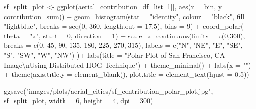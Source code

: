 \documentclass[
  letterpaper,
  DIV=11,
  numbers=noendperiod]{scrreprt}
\newenvironment{Shaded}{\begin{snugshade}}{\end{snugshade}}
\newcommand{\AttributeTok}[1]{\textcolor[rgb]{0.40,0.45,0.13}{#1}}
\newcommand{\DecValTok}[1]{\textcolor[rgb]{0.68,0.00,0.00}{#1}}
\newcommand{\FloatTok}[1]{\textcolor[rgb]{0.68,0.00,0.00}{#1}}
\newcommand{\FunctionTok}[1]{\textcolor[rgb]{0.28,0.35,0.67}{#1}}
\newcommand{\NormalTok}[1]{\textcolor[rgb]{0.00,0.23,0.31}{#1}}
\newcommand{\OtherTok}[1]{\textcolor[rgb]{0.00,0.23,0.31}{#1}}
\newcommand{\SpecialCharTok}[1]{\textcolor[rgb]{0.37,0.37,0.37}{#1}}
\newcommand{\StringTok}[1]{\textcolor[rgb]{0.13,0.47,0.30}{#1}}
\begin{document}
\begin{Shaded}
\begin{Highlighting}[]
\NormalTok{sf\_split\_plot }\OtherTok{\textless{}{-}}
  \FunctionTok{ggplot}\NormalTok{(aerial\_contribution\_df\_list[[}\DecValTok{1}\NormalTok{]], }
         \FunctionTok{aes}\NormalTok{(}\AttributeTok{x =}\NormalTok{ bin, }\AttributeTok{y =}\NormalTok{ contribution\_sum)) }\SpecialCharTok{+}
  \FunctionTok{geom\_histogram}\NormalTok{(}\AttributeTok{stat =} \StringTok{"identity"}\NormalTok{,}
                 \AttributeTok{colour =} \StringTok{"black"}\NormalTok{, }
                 \AttributeTok{fill =} \StringTok{"lightblue"}\NormalTok{, }
                 \AttributeTok{breaks =} \FunctionTok{seq}\NormalTok{(}\DecValTok{0}\NormalTok{, }\DecValTok{360}\NormalTok{, }\AttributeTok{length.out =} \FloatTok{17.5}\NormalTok{),}
                 \AttributeTok{bins =} \DecValTok{9}\NormalTok{) }\SpecialCharTok{+}
  \FunctionTok{coord\_polar}\NormalTok{(}
    \AttributeTok{theta =} \StringTok{"x"}\NormalTok{, }
    \AttributeTok{start =} \DecValTok{0}\NormalTok{, }
    \AttributeTok{direction =} \DecValTok{1}\NormalTok{) }\SpecialCharTok{+}
  \FunctionTok{scale\_x\_continuous}\NormalTok{(}\AttributeTok{limits =} \FunctionTok{c}\NormalTok{(}\DecValTok{0}\NormalTok{,}\DecValTok{360}\NormalTok{),}
    \AttributeTok{breaks =} \FunctionTok{c}\NormalTok{(}\DecValTok{0}\NormalTok{, }\DecValTok{45}\NormalTok{, }\DecValTok{90}\NormalTok{, }\DecValTok{135}\NormalTok{, }\DecValTok{180}\NormalTok{, }\DecValTok{225}\NormalTok{, }\DecValTok{270}\NormalTok{, }\DecValTok{315}\NormalTok{), }
    \AttributeTok{labels =} \FunctionTok{c}\NormalTok{(}\StringTok{"N"}\NormalTok{, }\StringTok{"NE"}\NormalTok{, }\StringTok{"E"}\NormalTok{, }\StringTok{"SE"}\NormalTok{, }\StringTok{"S"}\NormalTok{, }\StringTok{"SW"}\NormalTok{, }\StringTok{"W"}\NormalTok{, }\StringTok{"NW"}\NormalTok{)}
\NormalTok{  )}\SpecialCharTok{+}
  \FunctionTok{labs}\NormalTok{(}\AttributeTok{title =} \StringTok{"Polar Plot of San Francisco, CA Image}\SpecialCharTok{\textbackslash{}n}\StringTok{Using Distributed HOG Technique"}\NormalTok{) }\SpecialCharTok{+}
  \FunctionTok{theme\_minimal}\NormalTok{() }\SpecialCharTok{+}
  \FunctionTok{labs}\NormalTok{(}\AttributeTok{x =} \StringTok{""}\NormalTok{) }\SpecialCharTok{+}
  \FunctionTok{theme}\NormalTok{(}\AttributeTok{axis.title.y =} \FunctionTok{element\_blank}\NormalTok{(),}
        \AttributeTok{plot.title =} \FunctionTok{element\_text}\NormalTok{(}\AttributeTok{hjust =} \FloatTok{0.5}\NormalTok{))}

\FunctionTok{ggsave}\NormalTok{(}\StringTok{"images/plots/aerial\_cities/sf\_contribution\_polar\_plot.jpg"}\NormalTok{, sf\_split\_plot, }\AttributeTok{width =} \DecValTok{6}\NormalTok{, }\AttributeTok{height =} \DecValTok{4}\NormalTok{, }\AttributeTok{dpi =} \DecValTok{300}\NormalTok{)}
\end{Highlighting}
\end{Shaded}
\end{document}
